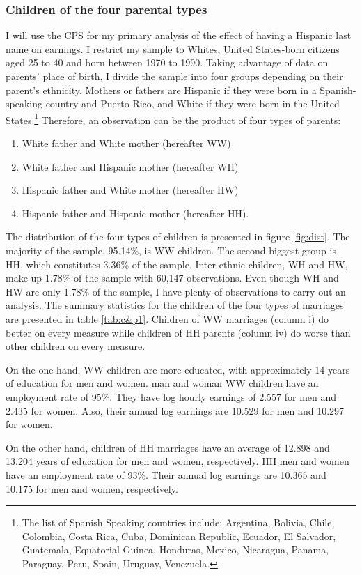 \documentclass[12pt, fullpage]{article}
\begin{document}
\subsubsection{Children of the four parental types}
I will use the CPS for my primary analysis of the effect of having a Hispanic last name on earnings. I restrict my sample to Whites, United States-born citizens aged 25 to 40 and born between 1970 to 1990. Taking advantage of data on parents' place of birth, I divide the sample into four groups depending on their parent's ethnicity. Mothers or fathers are Hispanic if they were born in a Spanish-speaking country and Puerto Rico, and White if they were born in the United States.\footnote{The list of Spanish Speaking countries include: Argentina, Bolivia, Chile, Colombia, Costa Rica, Cuba, Dominican Republic, Ecuador, El Salvador, Guatemala, Equatorial Guinea, Honduras, Mexico, Nicaragua, Panama, Paraguay, Peru, Spain, Uruguay, Venezuela.} Therefore, an observation can be the product of four types of parents: 
\begin{enumerate}
\item White father and White mother (hereafter WW) 
\item White father and Hispanic mother (hereafter WH)
\item Hispanic father and White mother (hereafter HW)
\item Hispanic father and Hispanic mother (hereafter HH).
\end{enumerate}
The distribution of the four types of children is presented in figure \ref{fig:dist}. The majority of the sample, 95.14\%, is WW children. The second biggest group is HH, which constitutes 3.36\% of the sample. Inter-ethnic children, WH and HW, make up 1.78\% of the sample with 60,147 observations. Even though WH and HW are only 1.78\% of the sample, I have plenty of observations to carry out an analysis. The summary statistics for the children of the four types of marriages are presented in table \ref{tab:c&p1}. Children of WW marriages (column i) do better on every measure while children of HH parents (column iv) do worse than other children on every measure. 


On the one hand, WW children are more educated, with approximately 14 years of education for men and women. man and woman WW children have an employment rate of 95\%. They have log hourly earnings of 2.557 for men and 2.435 for women. Also, their annual log earnings are 10.529 for men and 10.297 for women.

On the other hand, children of HH marriages have an average of 12.898 and 13.204 years of education for men and women, respectively. HH men and women have an employment rate of 93\%. Their annual log earnings are 10.365 and 10.175 for men and women, respectively. 
\end{document}
